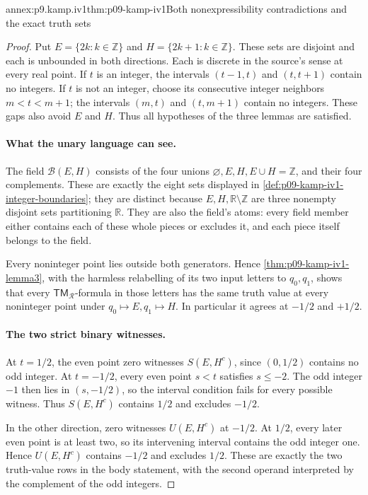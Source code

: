 \begin{annexitem}{annex:p9.kamp.iv1}{thm:p09-kamp-iv1}{Both nonexpressibility contradictions and the exact truth sets}
\begin{proof}
Put \(E=\{2k:k\in\mathbb Z\}\) and
\(H=\{2k+1:k\in\mathbb Z\}\). These sets are disjoint
and each is unbounded in both directions. Each is discrete in the
source's sense at every real point. If \(t\) is an integer,
the intervals \((t-1,t)\) and \((t,t+1)\) contain no
integers. If \(t\) is not an integer, choose its consecutive
integer neighbors \(m<t<m+1\); the intervals \((m,t)\)
and \((t,m+1)\) contain no integers. These gaps also avoid
\(E\) and \(H\). Thus all hypotheses of the three lemmas
are satisfied.

\paragraph{What the unary language can see.}
The field \(\mathcal B(E,H)\) consists of the four unions
\(\varnothing,E,H,E\cup H=\mathbb Z\), and their four
complements. These are exactly the eight sets displayed in
\cref{def:p09-kamp-iv1-integer-boundaries}; they are distinct
because \(E,H,\mathbb R\setminus\mathbb Z\) are three
nonempty disjoint sets partitioning \(\mathbb R\).
They are also the field's atoms: every field member either contains
each of these whole pieces or excludes it, and each piece itself
belongs to the field.

Every noninteger point lies outside both generators. Hence
\cref{thm:p09-kamp-iv1-lemma3}, with the harmless relabelling of
its two input letters to \(q_0,q_1\), shows that every
\(\mathsf{TM}_{\mathcal R}\)-formula in those letters has
the same truth value at every noninteger point under
\(q_0\mapsto E,q_1\mapsto H\). In particular it agrees
at \(-1/2\) and \(+1/2\).

\paragraph{The two strict binary witnesses.}
At \(t=1/2\), the even point zero witnesses
\(S(E,H^c)\), since \((0,1/2)\) contains no odd
integer. At \(t=-1/2\), every even point \(s<t\)
satisfies \(s\leq-2\). The odd integer \(-1\) then
lies in \((s,-1/2)\), so the interval condition fails for
every possible witness. Thus \(S(E,H^c)\) contains
\(1/2\) and excludes \(-1/2\).

In the other direction, zero witnesses \(U(E,H^c)\) at
\(-1/2\). At \(1/2\), every later even point is at
least two, so its intervening interval contains the odd integer
one. Hence \(U(E,H^c)\) contains \(-1/2\) and excludes
\(1/2\). These are exactly the two truth-value rows in the
body statement, with the second operand interpreted by the
complement of the odd integers.


\end{proof}
\end{annexitem}
